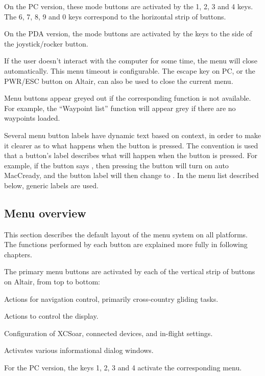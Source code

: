On the PC version, these mode buttons are activated by the
1, 2, 3 and 4 keys.  The 6, 7, 8, 9 and 0 keys correspond to the horizontal
strip of buttons.

On the PDA version, the mode buttons are activated by the keys to the
side of the joystick/rocker button.

If the user doesn't interact with the computer for some time, the
menu will close automatically.  This menu timeout is configurable.
The escape key on PC, or the PWR/ESC button on Altair, can
also be used to close the current menu.

Menu buttons appear greyed out if the corresponding function is not available. 
For example, the ``Waypoint list'' function will appear grey if there are no waypoints loaded.

Several menu button labels have dynamic text based on context, in
order to make it clearer as to what happens when the button is
pressed.  The convention is used that a button's label describes what
will happen when the button is pressed.  For example, if the button
says , then pressing the button will turn on auto
MacCready, and the button label will then change to . 
In the menu list described below, generic labels are used.

\subsection*{Menu overview}
This section describes the default layout of the menu system on all
platforms.  The functions performed by each button are explained more
fully in following chapters.

The primary menu buttons are activated by each of the vertical strip of buttons
on Altair, from top to bottom:
\begin{jspecs}
\item[\bmenu{Nav}] Actions for navigation control, primarily cross-country
gliding tasks.
\item[\bmenu{Display}] Actions to control the display.
\item[\bmenu{Config}] Configuration of XCSoar, connected devices, and in-flight
settings.
\item[\bmenu{Info}] Activates various informational dialog windows.
\end{jspecs}

For the PC version, the keys 1, 2, 3 and 4 activate the 
corresponding menu.

